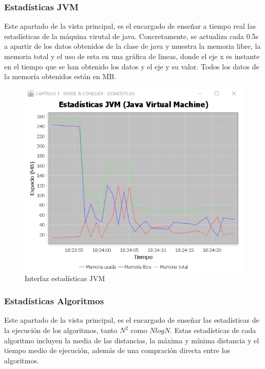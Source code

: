 \subsubsection{Estadísticas JVM}\label{Stats JVM}

Este apartado de la vista principal, es el encargado de enseñar a tiempo real las estadísticas de la máquina virutal de java. Concretamente, se actualiza cada 0.5s a apartir de los datos obtenidos de la clase de java  y muestra la memoria libre, la memoria total y el uso de esta en una gráfica de lineas, donde el eje x es instante en el tiempo que se han obtenido los datos y el eje y su valor. Todos los datos de la memoría obtenidos están en MB.

\begin{figure}[!h]
    \centering
    \includegraphics[width=\linewidth]{MVC/View/img/stats-jvm.png}
    \caption{Interfaz estadísticas JVM}
    \label{fig:Ejemplo stats JVM}
\end{figure}

\subsubsection{Estadísticas Algoritmos}\label{Stats Algt}

Este apartado de la vista principal, es el encargado de enseñar las estadísticas de la ejecución de los algoritmos, tanto $N^2$ como $N log N$. Estas estadísticas de cada algoritmo incluyen la media de las distancias, la máxima y mínima distancia y el tiempo medio de ejecución, además de una compración directa entre los algoritmos.

